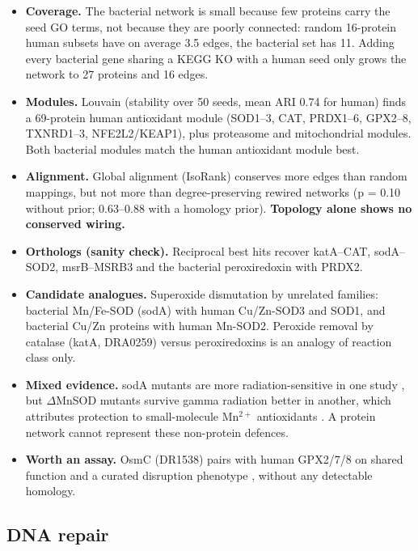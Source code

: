 \begin{itemize}
  \item \textbf{Coverage.} The bacterial network is small because few proteins carry the seed
    GO terms, not because they are poorly connected: random 16-protein human subsets have on
    average 3.5 edges, the bacterial set has 11. Adding every bacterial gene sharing a KEGG KO
    with a human seed only grows the network to 27 proteins and 16 edges.
  \item \textbf{Modules.} Louvain (stability over 50 seeds, mean ARI 0.74 for human) finds a
    69-protein human antioxidant module (SOD1--3, CAT, PRDX1--6, GPX2--8, TXNRD1--3,
    NFE2L2/KEAP1), plus proteasome and mitochondrial modules. Both bacterial modules match the
    human antioxidant module best.
  \item \textbf{Alignment.} Global alignment (IsoRank) conserves more edges than random
    mappings, but not more than degree-preserving rewired networks (p = 0.10 without prior;
    0.63--0.88 with a homology prior). \textbf{Topology alone shows no conserved wiring.}
  \item \textbf{Orthologs (sanity check).} Reciprocal best hits recover katA--CAT, sodA--SOD2,
    msrB--MSRB3 and the bacterial peroxiredoxin with PRDX2.
  \item \textbf{Candidate analogues.} Superoxide dismutation by unrelated families: bacterial
    Mn/Fe-SOD (sodA) with human Cu/Zn-SOD3 and SOD1, and bacterial Cu/Zn proteins with human
    Mn-SOD2. Peroxide removal by catalase (katA, DRA0259) versus peroxiredoxins is an analogy of
    reaction class only.
  \item \textbf{Mixed evidence.} sodA mutants are more radiation-sensitive in one study
    \cite{markillie1999}, but $\Delta$MnSOD mutants survive gamma radiation better in another,
    which attributes protection to small-molecule Mn$^{2+}$ antioxidants
    \cite{gaidamakova2022}. A protein network cannot represent these non-protein defences.
  \item \textbf{Worth an assay.} OsmC (DR1538) pairs with human GPX2/7/8 on shared function
    and a curated disruption phenotype \cite{wang2016}, without any detectable homology.
\end{itemize}

\subsection{DNA repair}

